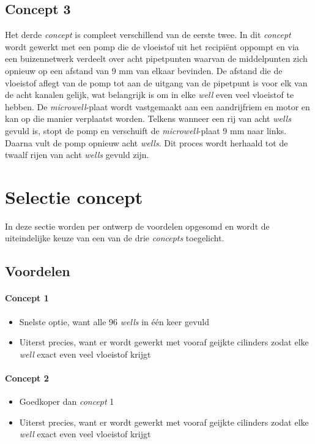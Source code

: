 \documentclass[a4paper,twoside,kulak]{kulakreport} %
\begin{document}
\subsection{Concept 3}
Het derde \textit{concept} is compleet verschillend van de eerste twee. In dit \textit{concept} wordt gewerkt met een pomp die de vloeistof uit het recipiënt oppompt en via een buizennetwerk verdeelt over acht pipetpunten waarvan de middelpunten zich opnieuw op een afstand van 9 mm van elkaar bevinden. De afstand die de vloeistof aflegt van de pomp tot aan de uitgang van de pipetpunt is voor elk van de acht kanalen gelijk, wat belangrijk is om in elke \textit{well} even veel vloeistof te hebben. De \textit{microwell}-plaat wordt vastgemaakt aan een aandrijfriem en motor en kan op die manier verplaatst worden. Telkens wanneer een rij van acht \textit{wells} gevuld is, stopt de pomp en verschuift de \textit{microwell}-plaat 9 mm naar links. Daarna vult de pomp opnieuw acht \textit{wells}. Dit proces wordt herhaald tot de twaalf rijen van acht \textit{wells} gevuld zijn. 

\section{Selectie concept}
In deze sectie worden per ontwerp de voordelen opgesomd en wordt de uiteindelijke keuze van een van de drie \textit{concepts} toegelicht.

\subsection{Voordelen}

\paragraph{Concept 1}
\begin{itemize}
	\item Snelste optie, want alle 96 \textit{wells} in één keer gevuld
	\item Uiterst precies, want er wordt gewerkt met vooraf geijkte cilinders zodat elke 	\textit{well} exact even veel vloeistof krijgt
\end{itemize}

\paragraph{Concept 2}
\begin{itemize}
	\item Goedkoper dan \textit{concept} 1
	\item Uiterst precies, want er wordt gewerkt met vooraf geijkte cilinders zodat elke 	\textit{well} exact even veel vloeistof krijgt
\end{itemize}
\end{document}
